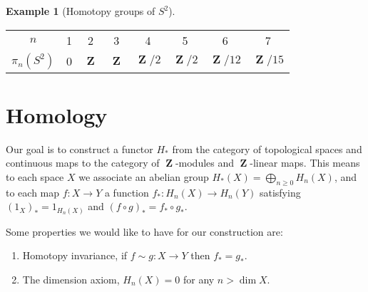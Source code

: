 \documentclass[10pt,]{book}
\theoremstyle{plain}
\theoremstyle{definition}
\newtheorem{example}[theorem]{Example}
\numberwithin{equation}{section}
\renewenvironment{table}%
{\begin{mbxtable}\setcounter{mbxtable}{\value{theorem}}\stepcounter{theorem}}%
{\end{mbxtable}}
\DeclareMathOperator{\ZZ}{\mathbf{Z}}
\begin{document}
\begin{example}[Homotopy groups of \(S^2\)]\label{example-3}
\begin{table}
\centering
\begin{tabular}{*{8}{c}}
\(n\)&1&2&3&4&5&6&7\\
\(\pi_n(S^2)\)&0&\(\ZZ\)&\(\ZZ\)&\(\ZZ/2\)&\(\ZZ/2\)&\(\ZZ/12\)&\(\ZZ/15\)\\
\end{tabular}
\end{table}
\end{example}
\typeout{************************************************}
\typeout{************************************************}
\section[Homology]{Homology}\label{section-3}

          Our goal is to construct a functor \(H_*\) from the category of topological spaces and continuous maps to the category of \(\ZZ\)-modules and \(\ZZ\)-linear maps.
          This means to each space \(X\) we associate an abelian group \(H_*(X) = \bigoplus_{n\ge 0}H_n(X)\), and to each map \(f\colon X \to Y\) a function \(f_*\colon H_n(X) \to H_n(Y)\) satisfying \((1_X)_* = 1_{H_n(X)}\) and \((f\circ g)_* = f_* \circ g_*\).
\par

          Some properties we would like to have for our construction are:
          \begin{enumerate}
\item{}Homotopy invariance, if \(f \sim g \colon X \to Y\) then \(f_* = g_*\).\item{}The dimension axiom, \(H_n(X) = 0\) for any \(n > \dim X\).\end{enumerate}

\typeout{************************************************}
\typeout{************************************************}
\end{document}
